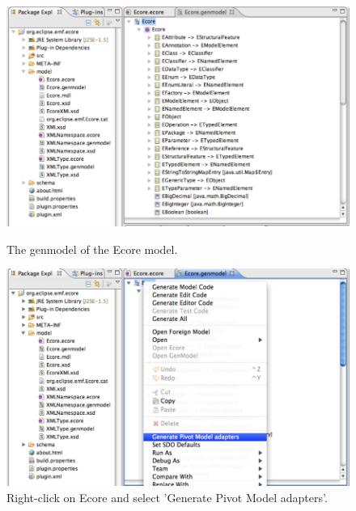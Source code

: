 \begin{figure}[!p]
	\centering
	\includegraphics[width=1.0\linewidth]{figures/pivotModelAdaption/EcoreGenModel}
	\caption{The genmodel of the Ecore model.}
	\label{pic:pivotModelAdaption:EcoreGenModel}

  \vspace{4.0em}
  
  \centering
	\includegraphics[width=1.0\linewidth]{figures/pivotModelAdaption/GeneratePivotModelAdapters}
	\caption{Right-click on Ecore and select 'Generate Pivot Model adapters'.}
	\label{pic:pivotModelAdaption:GeneratePivotModelAdapters}
\end{figure}

